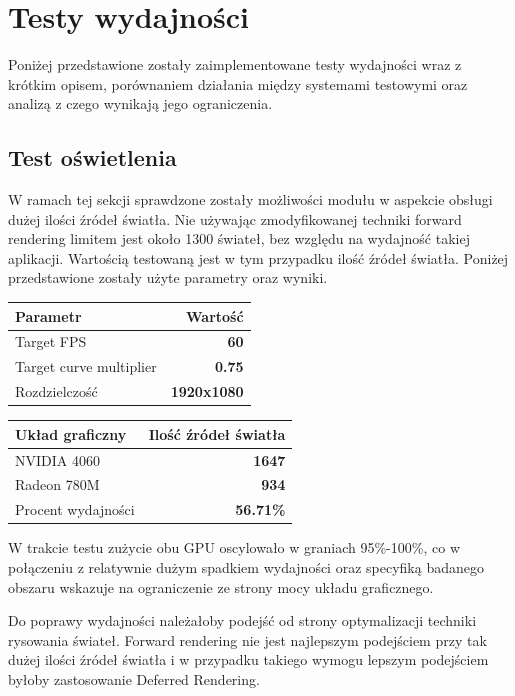 \chapter{Testy wydajności}
Poniżej przedstawione zostały zaimplementowane testy wydajności wraz z krótkim opisem, porównaniem działania między systemami testowymi oraz analizą z czego wynikają jego ograniczenia.

\section{Test oświetlenia}
W ramach tej sekcji sprawdzone zostały możliwości modułu w aspekcie obsługi dużej ilości źródeł światła. Nie używając zmodyfikowanej techniki forward rendering limitem jest około 1300 świateł, bez względu na wydajność takiej aplikacji. Wartością testowaną jest w tym przypadku ilość źródeł światła. Poniżej przedstawione zostały użyte parametry oraz wyniki.

\begin{center}
	\begin{tabular}{ |l r|}
		\hline
		\textbf{Parametr} & \textbf{Wartość} \\
		\hline
		Target FPS & \textbf{60} \\
		Target curve multiplier & \textbf{0.75} \\
		Rozdzielczość & \textbf{1920x1080} \\
		\hline
	\end{tabular}
	\quad
	\begin{tabular}{ |l r|}
		\hline
		\textbf{Układ graficzny} & \textbf{Ilość źródeł światła} \\
		\hline
		NVIDIA 4060 & \textbf{1647} \\
		Radeon 780M & \textbf{934} \\
		\hline
		Procent wydajności & \textbf{56.71\%} \\
		\hline
	\end{tabular}
\end{center}

W trakcie testu zużycie obu GPU oscylowało w graniach 95\%-100\%, co w połączeniu z relatywnie dużym spadkiem wydajności oraz specyfiką badanego obszaru wskazuje na ograniczenie ze strony mocy układu graficznego. 

Do poprawy wydajności należałoby podejść od strony optymalizacji techniki rysowania świateł. Forward rendering nie jest najlepszym podejściem przy tak dużej ilości źródeł światła i w przypadku takiego wymogu lepszym podejściem byłoby zastosowanie Deferred Rendering. 

